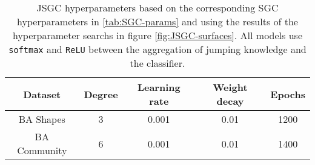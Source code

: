 \begin{table}[h]
    \centering
    \captionsetup{width=.9\textwidth}
    \begin{tabular}{c|cccc}
        \textbf{Dataset} &
        \textbf{Degree} &
        \textbf{Learning rate} &
        \textbf{Weight decay} &
        \textbf{Epochs} \\
        \midrule
        BA Shapes       & 3 & 0.001 & 0.01 & 1200 \\
        BA Community    & 6 & 0.001 & 0.01 & 1400 \\
    \end{tabular}
    \caption{JSGC hyperparameters based on the corresponding SGC hyperparameters in \ref{tab:SGC-params} and using the results of the hyperparameter searchs in figure \ref{fig:JSGC-surfaces}. All models use \texttt{softmax} and \texttt{ReLU} between the aggregation of jumping knowledge and the classifier.}
    \label{tab:JSGC-params}
\end{table}

